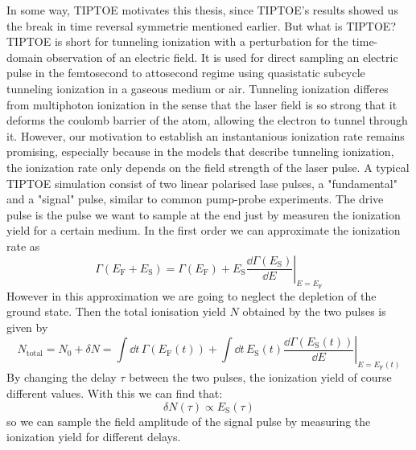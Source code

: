 In some way, TIPTOE motivates this thesis, since TIPTOE's results showed us the break in time reversal symmetrie mentioned earlier.
But what is TIPTOE? TIPTOE \cite{Park:18} is short for tunneling ionization with a perturbation for the time-domain observation of an electric field. 
It is used for direct sampling an electric pulse in the femtosecond to attosecond regime using quasistatic subcycle tunneling ionization in a gaseous medium or air.
Tunneling ionization differes from multiphoton ionization in the sense that the laser field is so strong that it deforms the coulomb barrier of the atom, allowing the electron to tunnel through it.
However, our motivation to establish an instantanious ionization rate remains promising, especially because in the models that describe tunneling ionization, the ionization rate only depends on the field strength of the laser pulse.
A typical TIPTOE simulation consist of two linear polarised lase pulses, a "fundamental" and a "signal" pulse, similar to common pump-probe experiments. 
The drive pulse is the pulse we want to sample at the end just by measuren the ionization yield for a certain medium.
In the first order we can approximate the ionization rate as
\begin{equation*}
    \Gamma(E_{\mathrm{F}}+E_{\mathrm{S}})=\Gamma(E_{\mathrm{F}})+\left.E_{\mathrm{S}}\frac{\dd \Gamma(E_{\mathrm{S}})}{\dd E}\right|_{E=E_{\mathrm{F}}}
\end{equation*}
However in this approximation we are going to neglect the depletion of the ground state. 
Then the total ionisation yield $N$ obtained by the two pulses is given by
\begin{equation*}
    N_{\mathrm{total}}=N_0+\delta N = \int \dd t\,\Gamma(E_{\mathrm{F}}(t))+\int \dd t\,E_{\mathrm{S}}(t)\left.\frac{\dd \Gamma(E_{\mathrm{S}}(t))}{\dd E}\right|_{E=E_{\mathrm{F}}(t)}
\end{equation*}
By changing the delay $\tau$ between the two pulses, the ionization yield of course different values.
With this we can find that:
\begin{equation*}
    \delta N(\tau)\propto E_{\mathrm{S}}(\tau)
\end{equation*}
so we can sample the field amplitude of the signal pulse by measuring the ionization yield for different delays.
